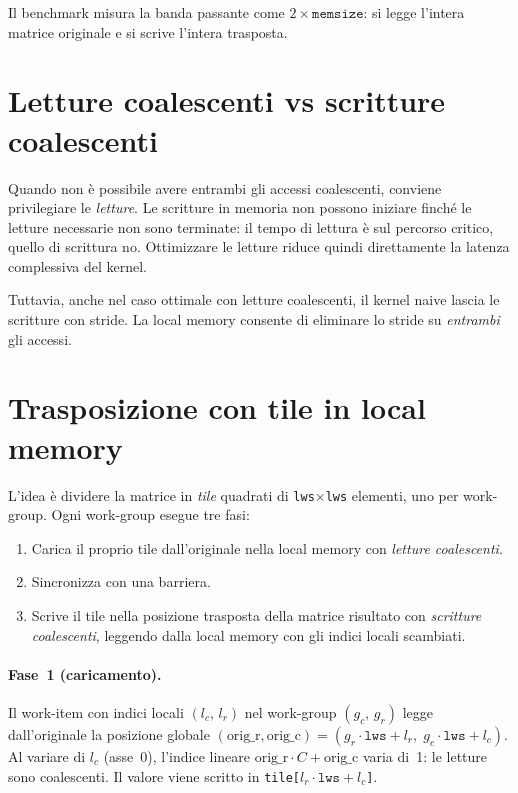 Il benchmark misura la banda passante come $2 \times \texttt{memsize}$: si legge l'intera matrice originale e si scrive l'intera trasposta.

\section{Letture coalescenti vs scritture coalescenti}\label{sec:opencl_lmem_coal_rw}

Quando non è possibile avere entrambi gli accessi coalescenti, conviene privilegiare le \emph{letture}. Le scritture in memoria non possono iniziare finché le letture necessarie non sono terminate: il tempo di lettura è sul percorso critico, quello di scrittura no. Ottimizzare le letture riduce quindi direttamente la latenza complessiva del kernel.

Tuttavia, anche nel caso ottimale con letture coalescenti, il kernel naive lascia le scritture con stride. La local memory consente di eliminare lo stride su \emph{entrambi} gli accessi.

\section{Trasposizione con tile in local memory}\label{sec:opencl_lmem_transpose_tile}

L'idea è dividere la matrice in \emph{tile} quadrati di \texttt{lws}$\times$\texttt{lws} elementi, uno per work-group. Ogni work-group esegue tre fasi:

\begin{enumerate}
    \item Carica il proprio tile dall'originale nella local memory con \emph{letture coalescenti}.
    \item Sincronizza con una barriera.
    \item Scrive il tile nella posizione trasposta della matrice risultato con \emph{scritture coalescenti}, leggendo dalla local memory con gli indici locali scambiati.
\end{enumerate}

\paragraph{Fase~1 (caricamento).} Il work-item con indici locali $(l_c,\,l_r)$ nel work-group $(g_c,\,g_r)$ legge dall'originale la posizione globale $(\text{orig\_r}, \text{orig\_c}) = (g_r \cdot \texttt{lws} + l_r,\; g_c \cdot \texttt{lws} + l_c)$. Al variare di $l_c$ (asse~0), l'indice lineare $\text{orig\_r} \cdot C + \text{orig\_c}$ varia di~1: le letture sono coalescenti. Il valore viene scritto in \texttt{tile[$l_r \cdot \texttt{lws} + l_c$]}.

